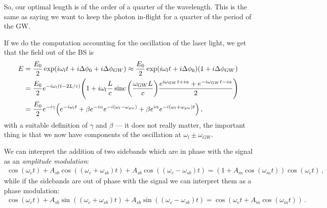 \documentclass[main.tex]{subfiles}
\begin{document}
So, our optimal length is of the order of a quarter of the wavelength.
This is the same as saying we want to keep the photon in-flight for a quarter of the period of the GW. 


If we do the computation accounting for the oscillation of the laser light, we get that the field out of the BS is 
%
\begin{align}
E &= \frac{E_0}{2} \exp(i \omega_{l} t + i \Delta \phi_0 + i \Delta \phi_{GW}) \approx \frac{E_0}{2} \exp(i \omega_{l} t + i \Delta \phi_0)
\qty(1 + i\Delta \phi_{GW}) \\
&= \frac{E_0}{2} e^{-i \omega_{l} (t - 2L / c)}
\qty(1 + i \omega_{l} \frac{L}{c} \operatorname{sinc} \qty(\frac{\omega_{GW} L}{c}) \frac{e^{i \omega_{GW} t + i \alpha } + e^{-i \omega_{GW} t - i \alpha }}{2})
\\
&= \frac{E_0}{2} e^{-i \gamma } \qty(e^{-i \omega_{l} t}
+ \beta e^{-i \alpha } e^{-i (\omega_{l} - \omega_{gw})} + \beta e^{i \alpha } e^{-i (\omega_{l} + \omega_{gw}) t})
\,,
\end{align}
%
with a suitable definition of \(\gamma \) and \(\beta \) --- it does not really matter, the important thing is that we now have components of the oscillation at \(\omega_{l} \pm \omega_{GW}\).


We can interpret the addition of two sidebands which are in phase with the signal as an \emph{amplitude modulation}:
%
\begin{align}
\cos(\omega_{c}t) 
+ A_{sb} \cos((\omega_{c} + \omega_{sb}) t )
+ A_{sb} \cos((\omega_{c} - \omega_{sb}) t )
= (1 + A_m \cos(\omega_{m} t)) \cos(\omega_{c} t )
\,,
\end{align}
%
while if the sidebands are out of phase with the signal we can interpret them as a phase modulation: 
%
\begin{align}
\cos(\omega_{c}t) 
+ A_{sb} \sin((\omega_{c} + \omega_{sb}) t )
+ A_{sb} \sin((\omega_{c} - \omega_{sb}) t )
= \cos(\omega_{c} t + A_m \cos(\omega_{m} t))
\,.
\end{align}
\end{document}
